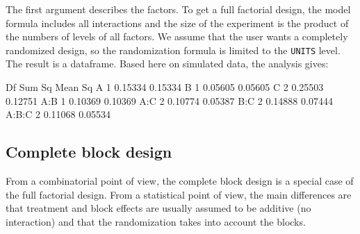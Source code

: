 \documentclass[a4paper]{article}
\begin{document}
The first argument describes the factors. To get a full factorial
design, the model formula includes all interactions and the size of
the experiment is the product of the numbers of levels of all
factors. We assume that the user wants a completely randomized design,
so the randomization formula is limited to the \texttt{UNITS}
level. The result is a dataframe. Based here on simulated data, the
analysis gives:
\begin{Schunk}
\begin{Soutput}
            Df  Sum Sq Mean Sq
A            1 0.15334 0.15334
B            1 0.05605 0.05605
C            2 0.25503 0.12751
A:B          1 0.10369 0.10369
A:C          2 0.10774 0.05387
B:C          2 0.14888 0.07444
A:B:C        2 0.11068 0.05534
\end{Soutput}
\end{Schunk}

\subsection{Complete block design}
From a combinatorial point of view, the complete block design is a
special case of the full factorial design. From a statistical point of
view, the main differences are that treatment and block effects are
usually assumed to be additive (no interaction) and that the
randomization takes into account the blocks.
\end{document}
